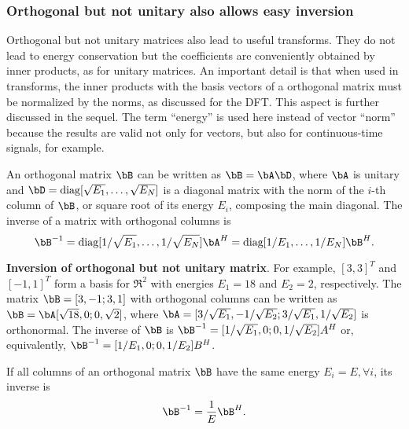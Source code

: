 \subsubsection{{\akadvanced} Orthogonal but not unitary also allows easy inversion}
\label{sec:ortho_not_unit}

Orthogonal but not unitary matrices also lead to useful transforms. They do not lead to energy conservation but the coefficients are conveniently obtained by inner products, as for unitary matrices. An important detail is that when used in transforms, the inner products with the basis vectors of a orthogonal matrix must be normalized by the norms, as discussed for the DFT. This aspect is further discussed in the sequel. The term ``energy'' is used here instead of vector ``norm'' because the results are valid not only for vectors, but also for continuous-time signals, for example.

An orthogonal matrix $\bB$ can be written as $\bB = \bA \bD$, where $\bA$ is unitary and $\bD=\textrm{diag}[\sqrt{E_1},\ldots,\sqrt{E_N}]$ is a diagonal matrix with the norm of the $i$-th column of $\bB$, or square root of its energy $E_i$, composing the main diagonal. The inverse of a matrix with orthogonal columns is
\[
\bB^{-1}=\textrm{diag}[1/\sqrt{E_1},\ldots,1/\sqrt{E_N}] \bA^H = \textrm{diag}[1/E_1,\ldots,1/E_N] \bB^H.
\]

\bExample \textbf{Inversion of orthogonal but not unitary matrix}.
For example, $[3,3]^T$ and $[-1,1]^T$ form a basis for $\Re^2$ with energies $E_1=18$ and $E_2=2$, respectively. The matrix $\bB=[3, -1; 3, 1]$ with orthogonal columns can be written as $\bB=\bA [\sqrt{18}, 0; 0, \sqrt{2}]$, where $\bA=[3/\sqrt{E_1}, -1/\sqrt{E_2}; 3/\sqrt{E_1}, 1/\sqrt{E_2}]$ is orthonormal. The inverse of $\bB$ is $\bB^{-1}=[1/\sqrt{E_1}, 0; 0, 1/\sqrt{E_2}] A^H$ or, equivalently, $\bB^{-1}=[1/E_1, 0; 0, 1/E_2] B^H$.
\eExample

If all columns of an orthogonal matrix $\bB$ have the same energy $E_i=E, \forall i$, its inverse is
\begin{equation}
\bB^{-1}  = \frac {1} {E} \bB^H.
\label{eq:nonorthogonaltransform}
\end{equation}

